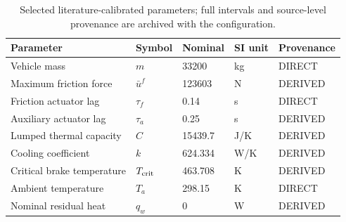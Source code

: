 \begin{table}[!t]
\centering
\caption{Selected literature-calibrated parameters; full intervals and source-level provenance are archived with the configuration.}
\label{tab:final-parameters}
\normalsize
\begin{tabular}{lllll}
\toprule
Parameter & Symbol & Nominal & SI unit & Provenance \\
\midrule
Vehicle mass & $m$ & 33200 & kg & DIRECT \\
Maximum friction force & $\bar u^f$ & 123603 & N & DERIVED \\
Friction actuator lag & $\tau_f$ & 0.14 & s & DIRECT \\
Auxiliary actuator lag & $\tau_a$ & 0.25 & s & DERIVED \\
Lumped thermal capacity & $C$ & 15439.7 & J/K & DERIVED \\
Cooling coefficient & $k$ & 624.334 & W/K & DERIVED \\
Critical brake temperature & $T_{\rm crit}$ & 463.708 & K & DERIVED \\
Ambient temperature & $T_a$ & 298.15 & K & DIRECT \\
Nominal residual heat & $q_w$ & 0 & W & DERIVED \\
\bottomrule
\end{tabular}
\end{table}

